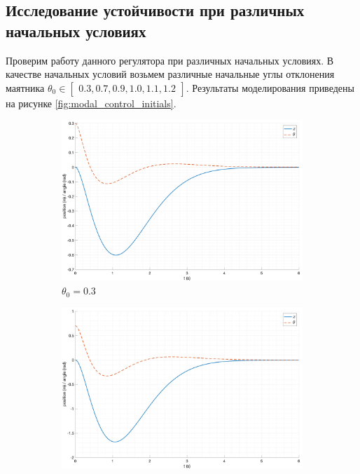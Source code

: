 \subsection{Исследование устойчивости при различных начальных условиях}
Проверим работу данного регулятора при различных начальных условиях. 
В качестве начальных условий возьмем различные начальные углы отклонения маятника $\theta_0 \in \begin{bmatrix}0.3, 0.7, 0.9, 1.0, 1.1, 1.2\end{bmatrix}$. Результаты 
моделирования приведены на рисунке \ref{fig:modal_control_initials}. 
\begin{figure}[ht!]
    \centering
    \begin{subfigure}[b]{0.45\textwidth}
        \includegraphics[width=\textwidth]{media/plots/modal_control/out_1.png}
        \caption{$\theta_0 = 0.3$}
    \end{subfigure}
    \begin{subfigure}[b]{0.45\textwidth}
        \includegraphics[width=\textwidth]{media/plots/modal_control/out_2.png}

\end{subfigure}
\end{figure}
